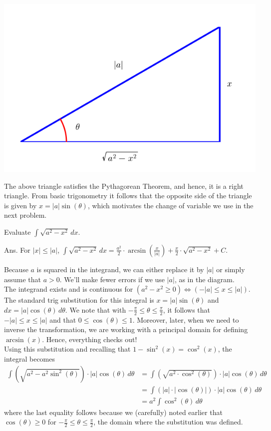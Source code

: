 \begin{center}
    \includegraphics[width=0.6\columnwidth]{graphics/Chap07/TrigSubSqRtAsqMinusXsq.png}
\end{center}

The above triangle satisfies the Pythagorean Theorem, and hence, it is a right triangle. From basic trigonometry it follows that the opposite side of the triangle is given by $x = |a| \sin(\theta)$, which motivates the change of variable we use in the next problem. \\

\begin{example}
\label{ex:aSquaredMinusXsquared}
    Evaluate $ \int \sqrt{a^2 - x^2} \, dx.$
\end{example}

\solution Ans. For $|x| \le |a|$, $\int \sqrt{a^2 - x^2} \, dx =  \frac{a^2}{2} \cdot \arcsin\left(\frac{x}{|a|} \right) + \frac{x}{2} \cdot \sqrt{a^2 - x^2} + C$.

Because $a$ is squared in the integrand, we can either replace it by $|a|$ or simply assume that $a > 0$. We'll make fewer errors if we use $|a|$, as in the diagram.  \\

The integrand exists and is continuous for $(a^2 - x^2 \ge 0) \iff (-|a| \le x \le |a|)$. The standard trig substitution for this integral is  \(x = |a| \sin(\theta) \) and  \( dx = |a| \cos(\theta) \, d\theta \). We note that with $ -\frac{\pi}{2} \le \theta \le \frac{\pi}{2}$, it follows that $-|a| \le x \le |a|$ and that $0 \le \cos(\theta) \le 1$. Moreover, later, when we need to inverse the transformation, we are working with a principal domain for defining $\arcsin(x)$. Hence, everything checks out!\\

Using this substitution and recalling that $1 - \sin^2(x) = \cos^2(x)$, the integral becomes
\begin{align*}
    \int \left( \sqrt{a^2 - a^2 \sin^2(\theta)} \right) \cdot |a| \cos(\theta) \, d\theta & =  \int \left( \sqrt{a^2\cdot  \cos^2(\theta)} \right) \cdot |a| \cos(\theta) \, d\theta \\[1em]
    & = \int \left( |a| \cdot  |\cos(\theta)| \right) \cdot |a| \cos(\theta) \, d\theta \\[1em]
    &= a^2 \int \cos^2(\theta)\, d\theta
\end{align*}
where the last equality follows because we (carefully) noted earlier that $\cos(\theta)\ge 0$ for $ -\frac{\pi}{2} \le \theta \le \frac{\pi}{2}$, the domain where the substitution was defined.\\

